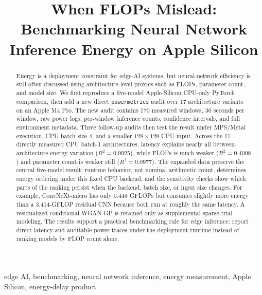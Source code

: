 \documentclass[conference]{IEEEtran}
\begin{document}
\title{When FLOPs Mislead: Benchmarking Neural Network Inference Energy on Apple Silicon}

\author{
}

\maketitle

\begin{abstract}
Energy is a deployment constraint for edge-AI systems, but neural-network
efficiency is still often discussed using architecture-level proxies such as
FLOPs, parameter count, and model size. We first reproduce a five-model
Apple-Silicon CPU-only PyTorch comparison, then add a new direct
\texttt{powermetrics} audit over 17 architecture variants on an Apple M4 Pro.
The new audit contains 170 measured windows, 30 seconds per window, raw power
logs, per-window inference counts, confidence intervals, and full environment
metadata. Three follow-up audits then test the result under MPS/Metal
execution, CPU batch size 4, and a smaller $128\times128$ CPU input. Across
the 17 directly measured CPU batch-1 architectures, latency explains
nearly all between-architecture energy variation ($R^2=0.9925$), while FLOPs
is much weaker ($R^2=0.4008$) and parameter count is weaker still
($R^2=0.0977$). The expanded data preserve the central five-model result:
runtime behavior, not nominal arithmetic count, determines energy ordering
under this fixed CPU backend, and the sensitivity checks show which parts of
the ranking persist when the backend, batch size, or input size changes. For
example, ConvNeXt-micro has only 0.448
GFLOPs but consumes slightly more energy than a 3.414-GFLOP residual CNN
because both run at roughly the same latency. A residualized conditional
WGAN-GP is retained only as supplemental sparse-trial modeling. The results
support a practical benchmarking rule for edge inference: report direct
latency and auditable power traces under the deployment runtime instead of
ranking models by FLOP count alone.
\end{abstract}

\begin{IEEEkeywords}
edge AI, benchmarking, neural network inference, energy measurement, Apple
Silicon, energy-delay product
\end{IEEEkeywords}
\end{document}
